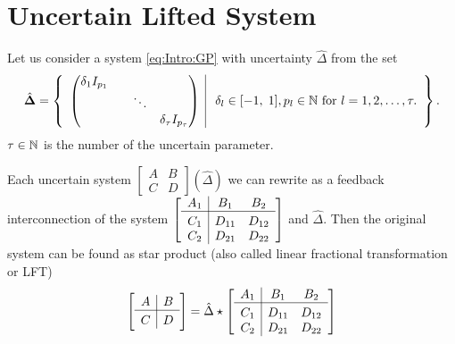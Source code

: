 %








\section{Uncertain Lifted System} 

Let us consider a system \eqref{eq:Intro:GP} with uncertainty $\hat{\Delta} $ from the set 
\begin{align}
\label{eq:Delta_hat_set}
\hat{\mathbf{\Delta}} =
\left\{\begin{array}{c|c}
\begin{pmatrix}
\delta_1 I_{p_1} & & &\\
& & \ddots &\\
& & &\delta_\tau I_{p_\tau}
\end{pmatrix} & \; \delta_l \in [-1,\;1], p_l \in {\mathbb{N}} \text{ for } l = 1, 2, \dots , \tau .
\end{array} \right\}.
\end{align}
$\tau \in {\mathbb{N}}$ is the number of the uncertain parameter.

Each uncertain system $\left[\begin{array}{c|c}
A & B \\\hline C &D
\end{array}\right]\left(\hat{\Delta}\right)$
we can rewrite as a feedback interconnection of the system 
$
\left[\begin{array}{c|c c}
A_1 & B_1 & B_2 \\\hline
C_1 & D_{11} & D_{12} \\
C_2 & D_{21} & D_{22}
\end{array}\right]
$
and $\hat{\Delta}$. 
Then the original system can be found as star product (also called linear fractional transformation or LFT)
\begin{align}
\left[\begin{array}{c|c}
A & B \\\hline C &D
\end{array}\right] = \hat{\Delta} \star \left[\begin{array}{c|c c}
A_1 & B_1 & B_2 \\\hline
C_1 & D_{11} & D_{12} \\
C_2 & D_{21} & D_{22}	
\end{array}\right]
\end{align}

